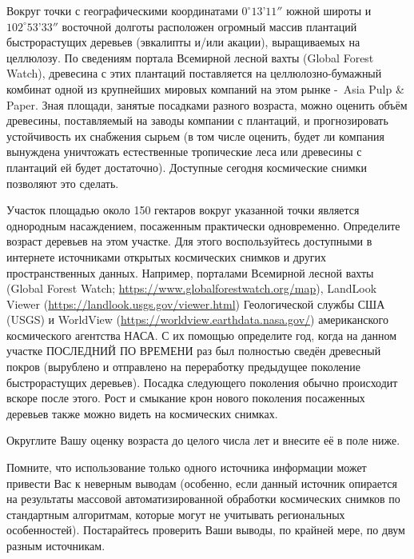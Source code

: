 
Вокруг точки с географическими координатами $0^{\circ}13’11''$ южной широты и \linebreak $102^{\circ}53’33''$
восточной долготы расположен огромный массив плантаций быстрорастущих деревьев (эвкалипты и/или акации), выращиваемых на целлюлозу. 
По сведениям портала Всемирной лесной вахты (Global Forest Watch), древесина с этих плантаций поставляется на 
целлюлозно-бумажный комбинат одной из крупнейших мировых компаний на этом рынке - Asia Pulp \& Paper. 
Зная площади, занятые посадками разного возраста, можно оценить объём древесины, поставляемый на 
заводы компании с плантаций, и прогнозировать устойчивость их снабжения сырьем (в том числе оценить, 
будет ли компания вынуждена уничтожать естественные тропические леса или древесины с плантаций ей будет достаточно). 
Доступные сегодня космические снимки позволяют это сделать.

Участок площадью около 150 гектаров вокруг указанной точки является однородным насаждением, 
посаженным практически одновременно. Определите возраст деревьев на этом участке. 
Для этого воспользуйтесь доступными в интернете источниками открытых космических снимков и других 
пространственных данных. Например, порталами Всемирной лесной вахты (Global Forest Watch; \url{https://www.globalforestwatch.org/map}), 
LandLook Viewer (\url{https://landlook.usgs.gov/viewer.html}) Геологической службы США (USGS) и WorldView (\url{https://worldview.earthdata.nasa.gov/}) американского космического агентства НАСА. 
С их помощью определите год, когда на данном участке ПОСЛЕДНИЙ ПО ВРЕМЕНИ раз был полностью сведён древесный покров 
(вырублено и отправлено на переработку предыдущее поколение быстрорастущих деревьев). 
Посадка следующего поколения обычно происходит вскоре после этого. Рост и смыкание крон нового поколения посаженных 
деревьев также можно видеть на космических снимках.

Округлите Вашу оценку возраста до целого числа лет и внесите её в поле ниже.

Помните, что использование только одного источника информации может привести Вас к неверным выводам 
(особенно, если данный источник опирается на результаты массовой автоматизированной обработки 
космических снимков по стандартным алгоритмам, которые могут не учитывать региональных особенностей). 
Постарайтесь проверить Ваши выводы, по крайней мере, по двум разным источникам.

 

